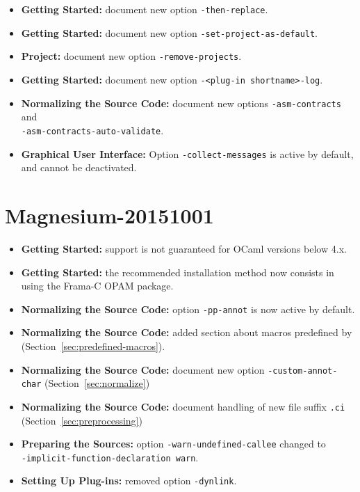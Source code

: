 \begin{itemize}
\item \textbf{Getting Started:} document new option \texttt{-then-replace}.
\item \textbf{Getting Started:} document new option
\texttt{-set-project-as-default}.
\item \textbf{Project:} document new option \texttt{-remove-projects}.
\item \textbf{Getting Started:} document new option
  \texttt{-<plug-in shortname>-log}.
\item \textbf{Normalizing the Source Code:} document new options
  \texttt{-asm-contracts} and\\ \texttt{-asm-contracts-auto-validate}.
\item \textbf{Graphical User Interface:} Option \texttt{-collect-messages} is
  active by default, and cannot be deactivated.
\end{itemize}

\section*{Magnesium-20151001}
\begin{itemize}
\item \textbf{Getting Started:} support is not guaranteed for OCaml versions
below 4.x.
\item \textbf{Getting Started:} the recommended installation method now consists
in using the Frama-C OPAM package.
\item \textbf{Normalizing the Source Code:} option \texttt{-pp-annot} is now
active by default.
\item \textbf{Normalizing the Source Code:} added section about macros
predefined by \FramaC (Section~\ref{sec:predefined-macros}).
\item \textbf{Normalizing the Source Code:} document new option
  \texttt{-custom-annot-char} (Section~\ref{sec:normalize})
\item \textbf{Normalizing the Source Code:} document handling of
  new file suffix \texttt{.ci} (Section~\ref{sec:preprocessing})
\item \textbf{Preparing the Sources:} option \texttt{-warn-undefined-callee}
  changed to \\ \texttt{-implicit-function-declaration warn}.
\item \textbf{Setting Up Plug-ins:} removed option \texttt{-dynlink}.
\end{itemize}

